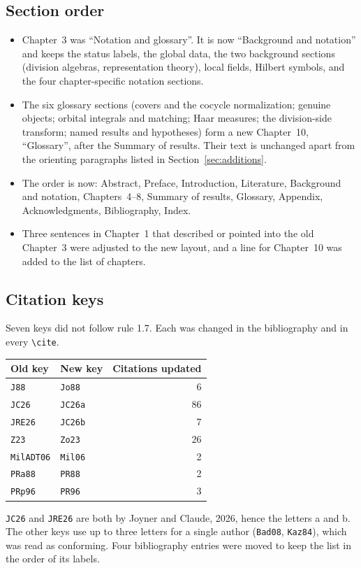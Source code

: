 \documentclass[12pt,letterpaper]{article}
\begin{document}
\subsection{Section order}
\begin{itemize}[leftmargin=*]
\item Chapter~3 was ``Notation and glossary''. It is now ``Background and notation'' and keeps the status labels, the global data, the two background sections (division algebras, representation theory), local fields, Hilbert symbols, and the four chapter-specific notation sections.
\item The six glossary sections (covers and the cocycle normalization; genuine objects; orbital integrals and matching; Haar measures; the division-side transform; named results and hypotheses) form a new Chapter~10, ``Glossary'', after the Summary of results. Their text is unchanged apart from the orienting paragraphs listed in Section~\ref{sec:additions}.
\item The order is now: Abstract, Preface, Introduction, Literature, Background and notation, Chapters~4--8, Summary of results, Glossary, Appendix, Acknowledgments, Bibliography, Index.
\item Three sentences in Chapter~1 that described or pointed into the old Chapter~3 were adjusted to the new layout, and a line for Chapter~10 was added to the list of chapters.
\end{itemize}

\subsection{Citation keys}
Seven keys did not follow rule 1.7. Each was changed in the bibliography and in every \verb|\cite|.
\begin{center}
\begin{tabular}{@{}llr@{}}\toprule
Old key & New key & Citations updated\\\midrule
\texttt{J88} & \texttt{Jo88} & 6\\
\texttt{JC26} & \texttt{JC26a} & 86\\
\texttt{JRE26} & \texttt{JC26b} & 7\\
\texttt{Z23} & \texttt{Zo23} & 26\\
\texttt{MilADT06} & \texttt{Mil06} & 2\\
\texttt{PRa88} & \texttt{PR88} & 2\\
\texttt{PRp96} & \texttt{PR96} & 3\\
\bottomrule\end{tabular}
\end{center}
\texttt{JC26} and \texttt{JRE26} are both by Joyner and Claude, 2026, hence the letters a and b. The other keys use up to three letters for a single author (\texttt{Bad08}, \texttt{Kaz84}), which was read as conforming. Four bibliography entries were moved to keep the list in the order of its labels.
\end{document}
